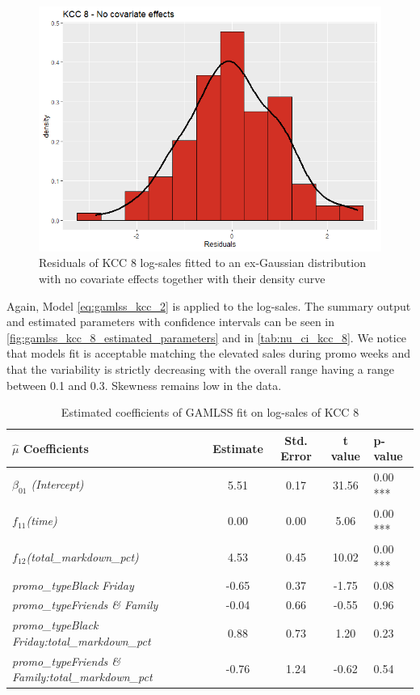 \begin{figure}[H]
\centering
  \includegraphics[width=0.45\linewidth]{figures/res_kcc_8_no_covariates.png}
  \caption{Residuals of KCC 8 log-sales fitted to an ex-Gaussian distribution with no covariate effects together with their density curve}
  \label{fig:res_kcc_8_no_covariates}
\end{figure}




Again, Model \ref{eq:gamlss_kcc_2} is applied to the log-sales. The summary output and estimated parameters with confidence intervals can be seen in \autoref{fig:gamlss_kcc_8_estimated_parameters} and in \autoref{tab:nu_ci_kcc_8}. We notice that models fit is acceptable matching the elevated sales during promo weeks and that the variability is strictly decreasing with the overall range having a range between 0.1 and 0.3. Skewness remains low in the data.
\\






\begin{table}[H]
\centering
\begin{tabular}{l|c|c|c|l}
  \hline
  \rowcolor{white}
 \textbf{$\hat{\mu}$ Coefficients} & \textbf{Estimate} & \textbf{Std. Error} & \textbf{t value} & \textbf{p-value} \\ 
  \hline\hline
\textit{$\beta_{01}$ (Intercept)} & 5.51 & 0.17 & 31.56 & 0.00 *** \\ 
  \textit{$f_{11}$(time)} & 0.00 & 0.00 & 5.06 & 0.00 *** \\ 
  \textit{$f_{12}$(total\_markdown\_pct)} & 4.53 & 0.45 & 10.02 & 0.00 *** \\ 
  \textit{promo\_typeBlack Friday} & -0.65 & 0.37 & -1.75 & 0.08  \\ 
  \textit{promo\_typeFriends \& Family} & -0.04 & 0.66 & -0.55 & 0.96 \\ 
  \textit{promo\_typeBlack Friday:total\_markdown\_pct} & 0.88 & 0.73 & 1.20 & 0.23  \\ 
  \textit{promo\_typeFriends \& Family:total\_markdown\_pct} & -0.76 & 1.24 & -0.62 & 0.54  \\ \hline
\end{tabular}
\caption{Estimated coefficients of \ac{GAMLSS} fit on log-sales of \ac{KCC} 8}
\label{tab:gamlss_coeff_kcc_8}
\end{table}






